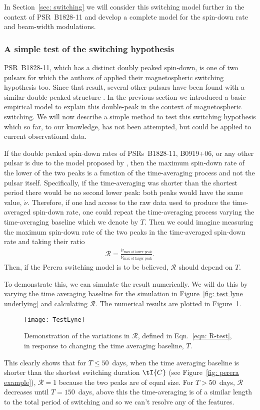 In Section~\ref{sec: switching} we will consider this switching
model further in the context of PSR~B1828-11 and develop a complete model for the
spin-down rate and beam-width modulations.

\subsubsection{A simple test of the switching hypothesis}
\label{sec: switching predictions}
PSR~B1828-11, which has a distinct doubly peaked spin-down, is one of two
pulsars for which the authors of \citet{Lyne2010} applied their magnetospheric
switching hypothesis too. Since
that result, several other pulsars have been found with a similar double-peaked
structure \citep{Perera2014, Perera2016}. In the previous section we introduced
a basic empirical model to explain this double-peak in the context of
magnetospheric switching. We will now describe a simple method to test this
switching hypothesis which so far, to our knowledge, has not been attempted,
but could be applied to current observational data.

If the double peaked spin-down rates of PSRs~B1828-11, B0919+06, or any other pulsar
is due to the model proposed by \citet{Perera2014}, then the maximum spin-down rate
of the lower of the two peaks is a function of the time-averaging process and not
the pulsar itself.  Specifically, if the time-averaging was shorter than the
shortest period there would be no second lower peak: both peaks would have the same
value, $\dot{\nu}$.  Therefore, if one had access to the raw data used to
produce the time-averaged spin-down rate, one could repeat the time-averaging
process varying the time-averaging baseline which we denote by $T$. Then we
could imagine measuring the maximum spin-down rate of the two peaks in the
time-averaged spin-down rate and taking their ratio
\begin{align}
\mathcal{R} = \frac{\dot{\nu}_\textrm{max of lower peak}}
                   {\dot{\nu}_\textrm{max of larger peak}}.
\label{eqn: R-test}
\end{align}
Then, if the Perera switching model is to be believed, $\mathcal{R}$ should depend on $T$.

To demonstrate this, we can simulate the result numerically. We will do this by
varying the time averaging baseline for the simulation in Figure~\ref{fig: test
lyne underlying} and calculating $\mathcal{R}$. The numerical results are
plotted in Figure~\ref{fig: test lyne}.
\begin{figure}[htb]
    \centering
    \texttt{[image: TestLyne]}
    \caption{Demonstration of the variations in $\mathcal{R}$, defined in
             Eqn.~\eqref{eqn: R-test}, in response to changing the time averaging
             baseline, $T$.}
    \label{fig: test lyne}
\end{figure}
This clearly shows that for $T\le50$~days, when the time averaging baseline is
shorter than the shortest switching duration $\tI{C}$ (see Figure~\ref{fig:
perera example}), $\mathcal{R}=1$ because the two peaks are of equal size.  For
$T>50$~days, $\mathcal{R}$ decreases until $T=150$~days, above this the
time-averaging is of a similar length to the total period of switching and so
we can't resolve any of the features.

